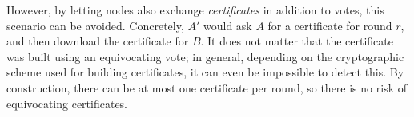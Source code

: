However, by letting nodes also exchange \emph{certificates} in addition to votes, this scenario can be avoided.
Concretely, $A'$ would ask $A$ for a certificate for round $r$, and then download the certificate for $B$.
It does not matter that the certificate was built using an equivocating vote; in general, depending on the cryptographic scheme used for building certificates, it can even be impossible to detect this.
By construction, there can be at most one certificate per round, so there is no risk of equivocating certificates.



